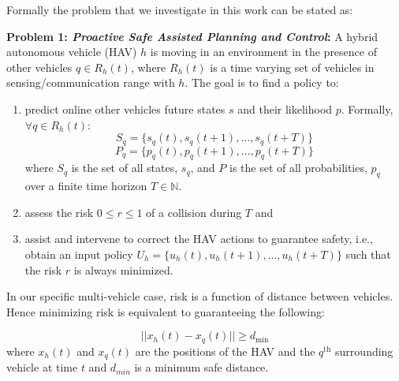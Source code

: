 \documentclass[letterpaper, 10 pt, conference]{ieeeconf}  %
\newcommand*{\N}{\mathbb{N}}
\begin{document}
Formally the problem that we investigate in this work can be stated as: 

\textbf{Problem 1: \textit{Proactive Safe Assisted Planning and Control}:} 
      A hybrid autonomous vehicle (HAV) $h$ is moving in an environment in the presence of other vehicles $q \in R_h(t)$, where $R_h(t)$ is a time varying set of vehicles in sensing/communication range with $h$. The goal is to find a policy to:
    \begin{enumerate}
        \item  predict online other vehicles future states $s$ and their likelihood $p$. Formally, $\forall q \in R_h(t)$:
    \begin{equation}
   S_q=\{{s_q(t), s_q(t+1),..., s_q(t+T)}\}
       \end{equation}
       \begin{equation}
   P_q=\{{p_q(t), p_q(t+1),..., p_q(t+T)}\}
    \end{equation}
     where $S_q$ is the set of all states, $s_q$, and $P$ is the set of all probabilities, $p_q$ over a finite time horizon $T\in\N$.  
    \item assess the risk $0\leq r \leq1$ of a collision during $T$ and
    \item assist and intervene to correct the HAV actions to guarantee safety, i.e., obtain an input policy $U_h=\{{u_h(t), u_h(t+1),..., u_h(t+T)}\}$ such that the risk $r$ is always minimized. 
    \end{enumerate}
   In our specific multi-vehicle case, risk is a function of distance between vehicles. Hence minimizing risk is equivalent to guaranteeing the following:
    
    \begin{equation}
        ||{x_h(t)-x_q(t)}|| \geq d_{\textrm{min}}
    \end{equation}
     where $x_h(t)$ and $x_q(t)$ are the positions of the HAV and the $q^{\textrm{th}}$ surrounding vehicle at time $t$ and $d_{min}$ is a minimum safe distance.    
    
\end{document}
